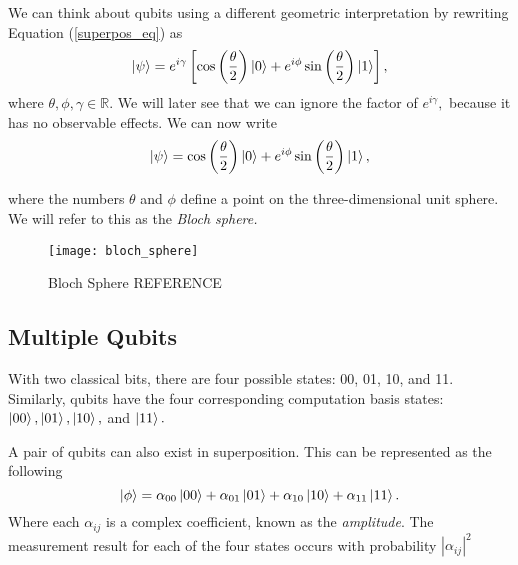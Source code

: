 We can think about qubits using a different geometric interpretation by rewriting Equation (\ref{superpos_eq}) as
\begin{equation}
\ket{\psi} = e^{i \gamma} \left[ \cos\left(\frac{\theta}{2}\right)\ket{0} + e^{i \phi}\sin\left(\frac{\theta}{2}\right)\ket{1} \right],
\end{equation}
where $ \theta, \phi, \gamma \in \mathbb{R}. $ We will later see that we can ignore the factor of $ e^{i\gamma}, $ because it has no observable effects. We can now write
\begin{equation}
\ket{\psi} = \cos\left(\frac{\theta}{2}\right)\ket{0} + e^{i \phi}\sin\left(\frac{\theta}{2}\right)\ket{1},
\end{equation}

where the numbers $ \theta $ and $ \phi $ define a point on the three-dimensional unit sphere. We will refer to this as the \textit{Bloch sphere.}

\begin{figure}[H]
	\centering
	\texttt{[image: bloch\_sphere]}
	\caption{Bloch Sphere REFERENCE}
\end{figure}

\subsection{Multiple Qubits}

With two classical bits, there are four possible states: 00, 01, 10, and 11. Similarly, qubits have the four corresponding computation basis states: $ \ket{00}, \ket{01}, \ket{10}, $ and $ \ket{11}. $

A pair of qubits can also exist in superposition. This can be represented as the following \[ \ket{\phi} = \alpha_{00}\ket{00} + \alpha_{01}\ket{01} + \alpha_{10}\ket{10} + \alpha_{11}\ket{11}. \] Where each $ \alpha_{ij} $ is a complex coefficient, known as the \textit{amplitude}. The measurement result for each of the four states occurs with probability $ \left| \alpha_{ij} \right|^2 $